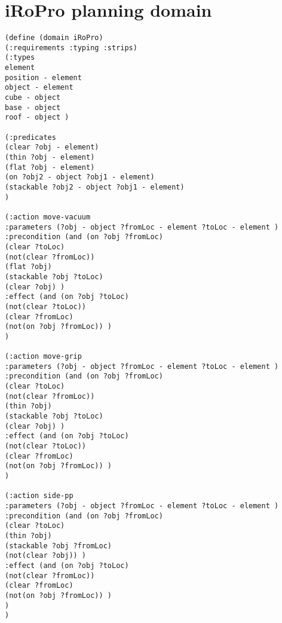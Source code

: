 \section{iRoPro planning domain}
\begin{verbatim}
(define (domain iRoPro)
(:requirements :typing :strips)
(:types 
element 
position - element 
object - element 
cube - object 
base - object 
roof - object )

(:predicates
(clear ?obj - element)
(thin ?obj - element)
(flat ?obj - element)
(on ?obj2 - object ?obj1 - element)
(stackable ?obj2 - object ?obj1 - element) 
)

(:action move-vacuum
:parameters (?obj - object ?fromLoc - element ?toLoc - element )
:precondition (and (on ?obj ?fromLoc)
(clear ?toLoc)
(not(clear ?fromLoc))
(flat ?obj)
(stackable ?obj ?toLoc)
(clear ?obj) )
:effect (and (on ?obj ?toLoc)
(not(clear ?toLoc))
(clear ?fromLoc)
(not(on ?obj ?fromLoc)) )
)

(:action move-grip
:parameters (?obj - object ?fromLoc - element ?toLoc - element )
:precondition (and (on ?obj ?fromLoc)
(clear ?toLoc)
(not(clear ?fromLoc))
(thin ?obj)
(stackable ?obj ?toLoc)
(clear ?obj) )
:effect (and (on ?obj ?toLoc)
(not(clear ?toLoc))
(clear ?fromLoc)
(not(on ?obj ?fromLoc)) )
)

(:action side-pp
:parameters (?obj - object ?fromLoc - element ?toLoc - element )
:precondition (and (on ?obj ?fromLoc)
(clear ?toLoc)
(thin ?obj)
(stackable ?obj ?fromLoc)
(not(clear ?obj)) )
:effect (and (on ?obj ?toLoc)
(not(clear ?fromLoc))
(clear ?fromLoc)
(not(on ?obj ?fromLoc)) )
)
)
\end{verbatim}

